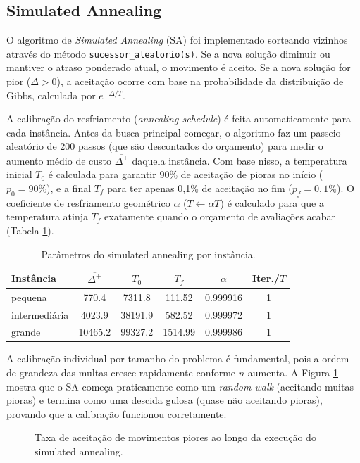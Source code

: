 \subsection{Simulated Annealing}
\label{subsec:tempera}

O algoritmo de \textit{Simulated Annealing} (SA) foi implementado sorteando vizinhos através do método \texttt{sucessor\_aleatorio(s)}. Se a nova solução diminuir ou mantiver o atraso ponderado atual, o movimento é aceito. Se a nova solução for pior ($\Delta > 0$), a aceitação ocorre com base na probabilidade da distribuição de Gibbs, calculada por $e^{-\Delta/T}$.

A calibração do resfriamento (\textit{annealing schedule}) é feita automaticamente para cada instância. Antes da busca principal começar, o algoritmo faz um passeio aleatório de 200 passos (que são descontados do orçamento) para medir o aumento médio de custo $\overline{\Delta^+}$ daquela instância. Com base nisso, a temperatura inicial $T_0$ é calculada para garantir 90\% de aceitação de pioras no início ($p_0 = 90\%$), e a final $T_f$ para ter apenas 0,1\% de aceitação no fim ($p_f = 0,1\%$). O coeficiente de resfriamento geométrico $\alpha$ ($T \leftarrow \alpha T$) é calculado para que a temperatura atinja $T_f$ exatamente quando o orçamento de avaliações acabar (Tabela \ref{tab:sa-parametros}).

\begin{table}[H]
\centering
\caption{Parâmetros do simulated annealing por instância.}
\label{tab:sa-parametros}
\begin{tabular}{lccccc}
\toprule
Instância     & $\overline{\Delta^+}$ & $T_0$ & $T_f$ & $\alpha$ & Iter./$T$ \\
\midrule
pequena & 770.4 & 7311.8 & 111.52 & 0.999916 & 1 \\
intermedi\'aria & 4023.9 & 38191.9 & 582.52 & 0.999972 & 1 \\
grande & 10465.2 & 99327.2 & 1514.99 & 0.999986 & 1 \\
\bottomrule
\end{tabular}
\end{table}

A calibração individual por tamanho do problema é fundamental, pois a ordem de grandeza das multas cresce rapidamente conforme $n$ aumenta. A Figura \ref{fig:sa-aceitacao} mostra que o SA começa praticamente como um \textit{random walk} (aceitando muitas pioras) e termina como uma descida gulosa (quase não aceitando pioras), provando que a calibração funcionou corretamente.

\begin{figure}[H]
\centering
{}
\caption{Taxa de aceitação de movimentos piores ao longo da execução do simulated annealing.}
\label{fig:sa-aceitacao}
\end{figure}